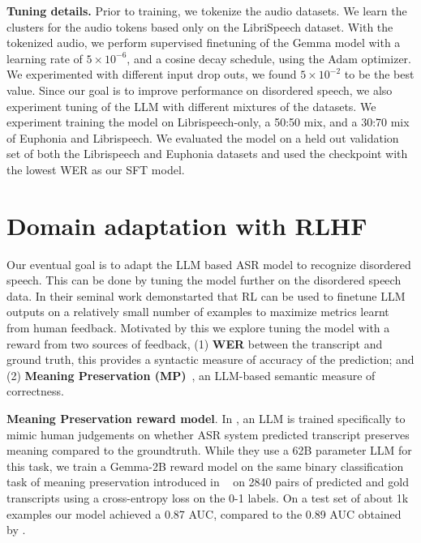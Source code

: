 \documentclass[conference]{IEEEtran}
\begin{document}
\noindent\textbf{Tuning details.}
%
Prior to training, we tokenize the audio datasets. We learn the clusters for the audio tokens based only on the LibriSpeech dataset. With the tokenized audio, we perform supervised finetuning of the Gemma model with a learning rate of $5\times10^{-6}$, and a cosine decay schedule, using the Adam optimizer. We experimented with different input drop outs, we found $5\times10^{-2}$ to be the best value.  Since our goal is to improve performance on disordered speech, we also experiment tuning of the LLM with different mixtures of the datasets. We experiment training the model on Librispeech-only, a 50:50 mix, and a 30:70 mix of Euphonia and Librispeech.   %
We evaluated the model on a held out validation set of both the Librispeech and Euphonia datasets and used the checkpoint with the lowest WER as our SFT model. %

%




%
%
    
%

    
%

%
%
%
%
%
%
%
%
%
%
%
%
%
%
%
%
%
%




%


%

%
%
\section{Domain adaptation with RLHF}
\label{sec:rlhf}

Our eventual goal is to adapt the LLM based ASR model to recognize disordered speech. This can be done by tuning the model further on the disordered speech data. %
In their seminal work \cite{ouyang2022training} demonstarted that RL can be used to finetune LLM outputs on a relatively small number of examples to maximize metrics learnt from human feedback. Motivated by this we %
%
explore tuning the model with a reward
%
%
from two sources of feedback, 
(1) \textbf{WER} between the transcript and ground truth, this provides a syntactic measure of accuracy of the prediction; and (2) \textbf{Meaning Preservation (MP)}~\cite{lattescore_icassp2024}, an LLM-based semantic measure of correctness.

{\textbf{Meaning Preservation reward model}}. In \cite{lattescore_icassp2024}, an LLM is trained specifically to mimic human judgements on whether ASR system predicted transcript preserves meaning compared to the groundtruth. While they use a 62B parameter LLM for this task, we train a Gemma-2B reward model on the same binary classification task of meaning preservation introduced in ~\cite{tobin2024automatic} on 2840 pairs of predicted and gold transcripts using a cross-entropy loss on the 0-1 labels. On a test set of about 1k examples our model achieved a 0.87 AUC, compared to the 0.89 AUC obtained by \cite{lattescore_icassp2024}.
\end{document}

